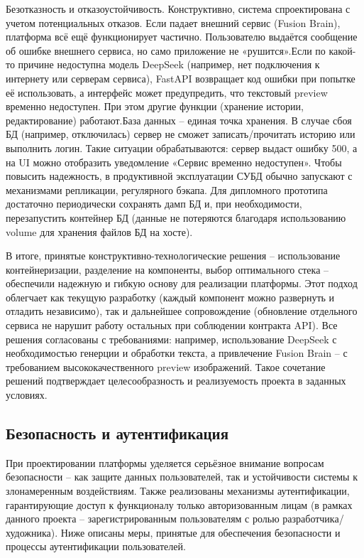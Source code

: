 Безотказность и отказоустойчивость. Конструктивно, система спроектирована с учетом потенциальных отказов. Если падает внешний сервис (Fusion Brain), платформа всё ещё функционирует частично. Пользователю выдаётся сообщение об ошибке внешнего сервиса, но само приложение не «рушится».Если по какой-то причине недоступна модель DeepSeek (например, нет подключения к интернету или серверам сервиса), FastAPI возвращает код ошибки при попытке её использовать, а интерфейс может предупредить, что текстовый preview временно недоступен. При этом другие функции (хранение истории, редактирование) работают.База данных – единая точка хранения. В случае сбоя БД (например, отключилась) сервер не сможет записать/прочитать историю или выполнить логин. Такие ситуации обрабатываются: сервер выдаст ошибку 500, а на UI можно отобразить уведомление «Сервис временно недоступен». Чтобы повысить надежность, в продуктивной эксплуатации СУБД обычно запускают с механизмами репликации, регулярного бэкапа. Для дипломного прототипа достаточно периодически сохранять дамп БД и, при необходимости, перезапустить контейнер БД (данные не потеряются благодаря использованию volume для хранения файлов БД на хосте).

В итоге, принятые конструктивно-технологические решения – использование контейнеризации, разделение на компоненты, выбор оптимального стека – обеспечили надежную и гибкую основу для реализации платформы. Этот подход облегчает как текущую разработку (каждый компонент можно развернуть и отладить независимо), так и дальнейшее сопровождение (обновление отдельного сервиса не нарушит работу остальных при соблюдении контракта API). Все решения согласованы с требованиями: например, использование DeepSeek с необходимостью генерции и обработки текста, а привлечение Fusion Brain – с требованием высококачественного preview изображений. Такое сочетание решений подтверждает целесообразность и реализуемость проекта в заданных условиях.

\subsection{Безопасность и аутентификация}

При проектировании платформы уделяется серьёзное внимание вопросам безопасности – как защите данных пользователей, так и устойчивости системы к злонамеренным воздействиям. Также реализованы механизмы аутентификации, гарантирующие доступ к функционалу только авторизованным лицам (в рамках данного проекта – зарегистрированным пользователям с ролью разработчика/художника). Ниже описаны меры, принятые для обеспечения безопасности и процессы аутентификации пользователей.


